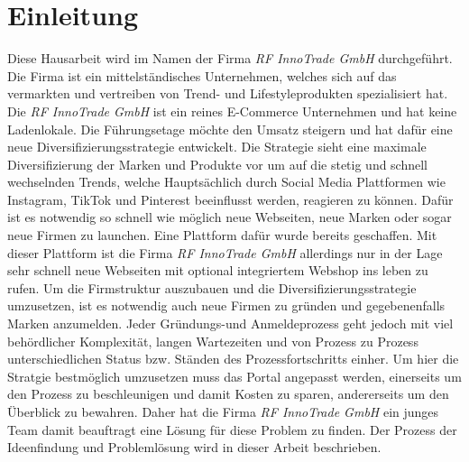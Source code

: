 \newpage

\section{Einleitung} \label{einleitung}
Diese Hausarbeit wird im Namen der Firma \textit{RF InnoTrade GmbH} durchgeführt. Die Firma ist ein mittelständisches Unternehmen, welches sich auf das vermarkten und vertreiben von Trend- und Lifestyleprodukten spezialisiert hat. Die \textit{RF InnoTrade GmbH} ist ein reines E-Commerce Unternehmen und hat keine Ladenlokale. Die Führungsetage möchte den Umsatz steigern und hat dafür eine neue Diversifizierungsstrategie entwickelt. Die Strategie sieht eine maximale Diversifizierung der Marken und Produkte vor um auf die stetig und schnell wechselnden Trends, welche Hauptsächlich durch Social Media Plattformen wie Instagram, TikTok und Pinterest beeinflusst werden, reagieren zu können. Dafür ist es notwendig so schnell wie möglich neue Webseiten, neue Marken oder sogar neue Firmen zu launchen.
Eine Plattform dafür wurde bereits geschaffen. Mit dieser Plattform ist die Firma \textit{RF InnoTrade GmbH} allerdings nur in der Lage sehr schnell neue Webseiten mit optional integriertem Webshop ins leben zu rufen. Um die Firmstruktur auszubauen und die Diversifizierungsstrategie umzusetzen, ist es notwendig auch neue Firmen zu gründen und gegebenenfalls Marken anzumelden. Jeder Gründungs-und Anmeldeprozess geht jedoch mit viel behördlicher Komplexität, langen Wartezeiten und von Prozess zu Prozess unterschiedlichen Status bzw. Ständen des Prozessfortschritts einher. Um hier die Stratgie bestmöglich umzusetzen muss das Portal angepasst werden, einerseits um den Prozess zu beschleunigen und damit Kosten zu sparen, andererseits um den Überblick zu bewahren.
Daher hat die Firma \textit{RF InnoTrade GmbH} ein junges Team damit beauftragt eine Lösung für diese Problem zu finden. Der Prozess der Ideenfindung und Problemlösung wird in dieser Arbeit beschrieben.